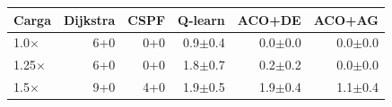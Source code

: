 \begin{tabular}{@{}lrrrrr@{}}
\toprule
Carga & Dijkstra & CSPF & Q-learn & ACO+DE & ACO+AG\\
\midrule
1.0$\times$ & 6+0 & 0+0 & 0.9$\pm$0.4 & 0.0$\pm$0.0 & 0.0$\pm$0.0\\
1.25$\times$ & 6+0 & 0+0 & 1.8$\pm$0.7 & 0.2$\pm$0.2 & 0.0$\pm$0.0\\
1.5$\times$ & 9+0 & 4+0 & 1.9$\pm$0.5 & 1.9$\pm$0.4 & 1.1$\pm$0.4\\
\bottomrule
\end{tabular}
